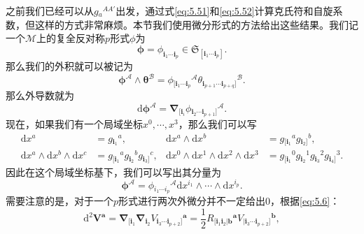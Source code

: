之前我们已经可以从$g{_{a}}^{AA'}$出发，通过式\ref{eq:5.51}和\ref{eq:5.52}计算克氏符和自旋系数，但这样的方式非常麻烦。本节我们使用微分形式的方法给出这些结果。我们记一个$\mathcal{M}$上的复全反对称$p$形式$\phi $为
\begin{equation*}
	\boldsymbol{\phi } =\phi _{\boldsymbol{i}_{1} \cdots \boldsymbol{i}_{p}} \in \mathfrak{S}_{[\boldsymbol{i}_{1} \cdots \boldsymbol{i}_{p}]} .
\end{equation*}
那么我们的外积就可以被记为
\begin{equation*}
	\boldsymbol{\phi }^{\mathcal{A}} \land \boldsymbol{\theta}^{\mathcal{B}} =\phi {_{[\boldsymbol{i}_{1} \cdots \boldsymbol{i}_{p}}}^{\mathcal{A}} \theta {_{\boldsymbol{i}_{p+1} \cdots \boldsymbol{i}_{p+q}]}}^{\mathcal{B}} .
\end{equation*}
那么外导数就为
\begin{equation*}
	\mathrm{d}\boldsymbol{\phi}^{\mathcal{A}} =\boldsymbol{\nabla }_{[\boldsymbol{i}_{i}} \phi {_{\boldsymbol{i}_{2} \cdots \boldsymbol{i}_{p+1}]}}^{\mathcal{A}} .
\end{equation*}
现在，如果我们有一个局域坐标$x^{0} ,\cdots ,x^{3}$，那么我们可以写
\begin{equation*}
	\begin{aligned}
		\mathrm{d} x^{a} & =g{_{\boldsymbol{i}_{1}}}^{a} , & \mathrm{d} x^{a} \land \mathrm{d} x^{b} & =g{_{[\boldsymbol{i}_{1}}}^{a} g{_{\boldsymbol{i}_{2}]}}^{b} ,\\
		\mathrm{d} x^{a} \land \mathrm{d} x^{b} \land \mathrm{d} x^{c} & =g{_{[\boldsymbol{i}_{1}}}^{a} g{_{\boldsymbol{i}_{2}}}^{b} g{_{\boldsymbol{i}_{3}]}}^{c} , & \mathrm{d} x^{0} \land \mathrm{d} x^{1} \land \mathrm{d} x^{2} \land \mathrm{d} x^{3} & =g{_{[\boldsymbol{i}_{1}}}^{0} g{_{\boldsymbol{i}_{2}}}^{1} g{_{\boldsymbol{i}_{3}}}^{2} g{_{\boldsymbol{i}_{4}]}}^{3} .
	\end{aligned}
\end{equation*}
因此在这个局域坐标基下，我们可以写出其分量为
\begin{equation*}
	\boldsymbol{\phi}^{\mathcal{A}} =\phi {_{i_{1} \cdots i_{p}}}^{\mathcal{A}}\mathrm{d} x^{i_{1}} \land \cdots \land \mathrm{d} x^{i_{p}} .
\end{equation*}
需要注意的是，对于一个$p$形式进行两次外微分并不一定给出$0$，根据\ref{eq:5.6}：
\begin{equation*}
	\mathrm{d}^{2}\boldsymbol{V}^{\boldsymbol{a}} =\boldsymbol{\nabla }_{[\boldsymbol{i}_{1}}\boldsymbol{\nabla }_{\boldsymbol{i}_{2}} V{_{\boldsymbol{i}_{3} \cdots \boldsymbol{i}_{p+2}]}}^{\boldsymbol{a}} =\frac{1}{2} R{_{[\boldsymbol{i}_{1}\boldsymbol{i}_{2} |\boldsymbol{b}}}^{\boldsymbol{a}} V{_{|\boldsymbol{i}_{3} \cdots \boldsymbol{i}_{p+2}]}}^{\boldsymbol{b}} ,
\end{equation*}
